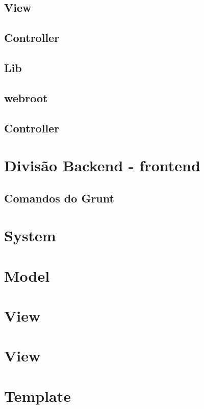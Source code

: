         \subsection{View\label{sec:app-view}}

        \subsection{Controller\label{sec:app-controller}}

        \subsection{Lib\label{sec:app-lib}}

        \subsection{webroot\label{sec:app-lib}}


        \subsection{Controller\label{sec:app-controller}}


    \section{Divisão Backend - frontend\label{sec:back-front}}


        \subsection{Comandos do Grunt\label{sub:comandos-grunt}}

    \section{System\label{sec:estrutura-pastas}}

    \section{Model\label{sec:estrutura-pastas}}

    \section{View\label{sec:estrutura-pastas}}

    \section{View\label{sec:estrutura-pastas}}

    \section{Template\label{sec:estrutura-pastas}}
